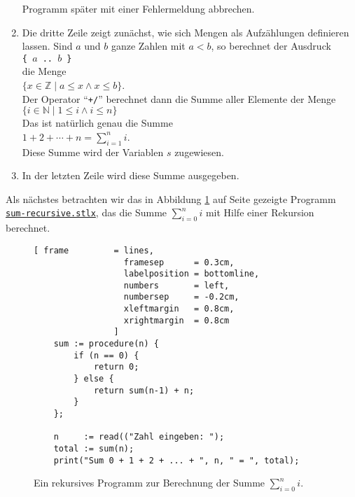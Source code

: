 \begin{enumerate}
      Programm später mit einer Fehlermeldung abbrechen.
\item Die dritte Zeile zeigt zunächst, wie sich Mengen als Aufzählungen definieren lassen.  Sind
      $a$ und $b$ ganze Zahlen mit $a < b$, so berechnet der Ausdruck
      \\[0.2cm]
      \hspace*{1.3cm}
      \texttt{\{ $a$ .. $b$ \}}
      \\[0.2cm]
      die Menge
      \\[0.2cm]
      \hspace*{1.3cm}
      $\{ x \in \mathbb{Z} \mid a \leq x \wedge x \leq b \}$.
      \\[0.2cm]
      Der Operator ``\texttt{+/}'' berechnet dann die Summe aller Elemente der Menge
      \\[0.2cm]
      \hspace*{1.3cm}
      $\{ i \in \mathbb{N} \mid 1 \leq i  \wedge i \leq n \}$
      \\[0.2cm]
      Das ist natürlich genau die Summe
      \\[0.2cm]
      \hspace*{1.3cm}
      $1 + 2 + \cdots + n = \sum\limits_{i=1}^n i$.
      \\[0.2cm]
      Diese Summe wird der Variablen $s$ zugewiesen.
\item In der letzten Zeile wird diese Summe ausgegeben.
\end{enumerate}
Als nächstes betrachten wir das in Abbildung \ref{fig:sum-recursive.stlx} auf Seite
\pageref{fig:sum-recursive.stlx} gezeigte Programm 
\href{https://github.com/karlstroetmann/Logik/blob/master/SetlX/sum-recursive.stlx}{\texttt{sum-recursive.stlx}}, 
das die Summe $\sum\limits_{i=0}^n i$ mit Hilfe einer Rekursion berechnet.

\begin{figure}[!ht]
  \centering
\begin{Verbatim}[ frame         = lines, 
                  framesep      = 0.3cm, 
                  labelposition = bottomline,
                  numbers       = left,
                  numbersep     = -0.2cm,
                  xleftmargin   = 0.8cm,
                  xrightmargin  = 0.8cm
                ]
    sum := procedure(n) {
        if (n == 0) { 
            return 0;
        } else {
            return sum(n-1) + n;
        }
    };
    
    n     := read(("Zahl eingeben: "); 
    total := sum(n);
    print("Sum 0 + 1 + 2 + ... + ", n, " = ", total);
\end{Verbatim} 
\vspace*{-0.3cm}
  \caption{Ein rekursives Programm zur Berechnung der Summe $\sum\limits_{i=0}^ni$.}
  \label{fig:sum-recursive.stlx}
\end{figure} 

